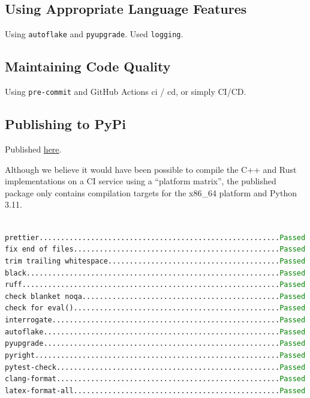 \documentclass{prettytex/ox/mmsc-special-topic}
\begin{document}
  \subsection{Using Appropriate Language Features}
  Using \texttt{autoflake} and \texttt{pyupgrade}.
  Used \texttt{logging}.
  \subsection{Maintaining Code Quality}
  Using \texttt{pre-commit} and GitHub Actions \gls{ci} / \gls{cd}, or simply CI/CD.

  \subsection{Publishing to PyPi}
  Published \href{https://pypi.org/project/melon-scheduler/}{here}.

  Although we believe it would have been possible to compile the C++ and Rust implementations on a CI service using a ``platform matrix'', the published package only contains compilation targets for the x86\_64 platform and Python 3.11.

  \texttt{
    \hspace*{-1em} prettier........................................................\textcolor{green}{Passed} \\
    fix end of files................................................\textcolor{green}{Passed} \\
    trim trailing whitespace........................................\textcolor{green}{Passed} \\
    black...........................................................\textcolor{green}{Passed} \\
    ruff............................................................\textcolor{green}{Passed} \\
    check blanket noqa..............................................\textcolor{green}{Passed} \\
    check for eval()................................................\textcolor{green}{Passed} \\
    interrogate.....................................................\textcolor{green}{Passed} \\
    autoflake.......................................................\textcolor{green}{Passed} \\
    pyupgrade.......................................................\textcolor{green}{Passed} \\
    pyright.........................................................\textcolor{green}{Passed} \\
    pytest-check....................................................\textcolor{green}{Passed} \\
    clang-format....................................................\textcolor{green}{Passed} \\
    latex-format-all................................................\textcolor{green}{Passed}
  }
\end{document}
